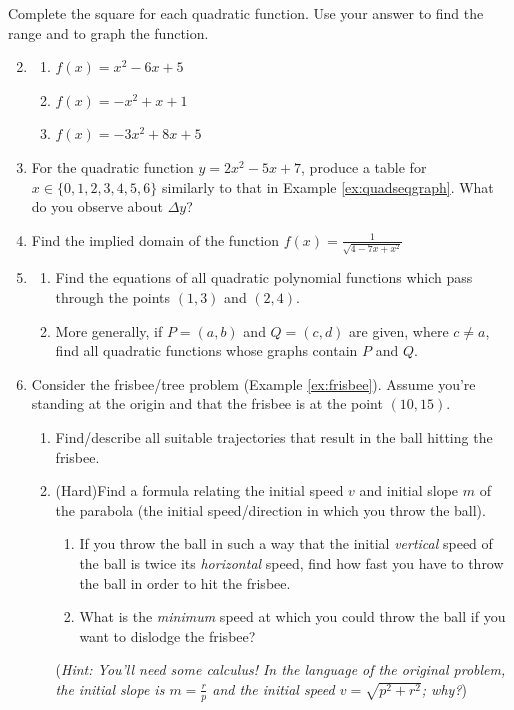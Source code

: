 \begin{exercises}{}{}
	\exstart Complete the square for each quadratic function. Use your answer to find the range and to graph the function.
	\begin{enumerate}\setcounter{enumi}{1}  
	  \item[]\begin{enumerate}
	    \item $f(x)=x^2-6x+5$ %
	    \item $f(x)=-x^2+x+1$ %
	    \item $f(x)=-3x^2+8x+5$ %
	  \end{enumerate}
	 
	  
	  \item For the quadratic function $y=2x^2-5x+7$, produce a table for $x\in\{0,1,2,3,4,5,6\}$ similarly to that in Example \ref{ex:quadseqgraph}. What do you observe about $\Delta y$?
	  
	  
	  
	  \item Find the implied domain of the function $f(x)=\frac 1{\sqrt{4-7x+x^2}}$
	  
	  
		\item\begin{enumerate}
		  \item Find the equations of all quadratic polynomial functions which pass through the points $(1,3)$ and $(2,4)$.
			\item More generally, if $P=(a,b)$ and $Q=(c,d)$ are given, where $c\neq a$, find all quadratic functions whose graphs contain $P$ and $Q$.
		\end{enumerate}
	  
	  \item\label{exs:frisbee} Consider the frisbee/tree problem (Example \ref{ex:frisbee}). Assume you're standing at the origin and that the frisbee is at the point $(10,15)$.
	  \begin{enumerate}
	    \item  Find/describe all suitable trajectories that result in the ball hitting the frisbee.
	    \item (Hard)\lstsp Find a formula relating the initial speed $v$ and initial slope $m$ of the parabola (the initial speed/direction in which you throw the ball).
	    \begin{enumerate}
				\item If you throw the ball in such a way that the initial \emph{vertical} speed of the ball is twice its \emph{horizontal} speed, find how fast you have to throw the ball in order to hit the frisbee.
	      \item What is the \emph{minimum} speed at which you could throw the ball if you want to dislodge the frisbee?
	    \end{enumerate}
	    (\emph{Hint: You'll need some calculus! In the language of the original problem, the initial slope is $m=\frac rp$ and the initial speed $v=\sqrt{p^2+r^2}$; why?})
		\end{enumerate}

	\end{enumerate}
\end{exercises}

